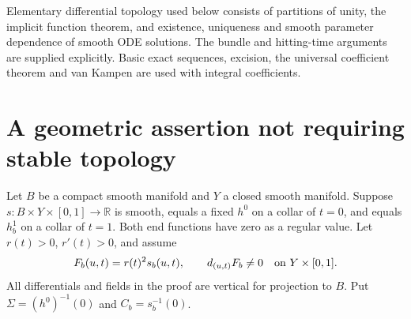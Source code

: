 \documentclass[11pt]{article}
\newcommand{\R}{\mathbb R}
\begin{document}
Elementary differential topology used below consists of partitions of
unity, the implicit function theorem, and existence, uniqueness and smooth
parameter dependence of smooth ODE solutions. The bundle and hitting-time
arguments are supplied explicitly. Basic exact sequences, excision, the
universal coefficient theorem and van Kampen are used with integral
coefficients.

\section{A geometric assertion not requiring stable topology}

Let $B$ be a compact smooth manifold and $Y$ a closed smooth manifold.
Suppose $s:B\times Y\times[0,1]\to\R$ is smooth, equals a fixed $h^0$
on a collar of $t=0$, and equals $h_b^1$ on a collar of $t=1$.
Both end functions have zero as a regular value. Let $r(t)>0$, $r'(t)>0$,
and assume
\[
 F_b(u,t)=r(t)^2s_b(u,t),\qquad d_{(u,t)}F_b\ne0
 \quad\hbox{on }Y\times[0,1].
\]
All differentials and fields in the proof are vertical for projection to
$B$. Put $\Sigma=(h^0)^{-1}(0)$ and $C_b=s_b^{-1}(0)$.
\end{document}
